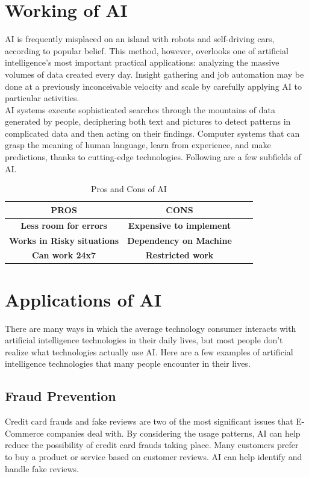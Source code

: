 \documentclass[conference]{IEEEtran}
\begin{document}
\section{Working of AI}
AI is frequently misplaced on an island with robots and self-driving cars, according to popular belief. This method, however, overlooks one of artificial intelligence's most important practical applications: analyzing the massive volumes of data created every day. Insight gathering and job automation may be done at a previously inconceivable velocity and scale by carefully applying AI to particular activities.\\
AI systems execute sophisticated searches through the mountains of data generated by people, deciphering both text and pictures to detect patterns in complicated data and then acting on their findings. Computer systems that can grasp the meaning of human language, learn from experience, and make predictions, thanks to cutting-edge technologies. Following are a few subfields of AI.\\

\begin{table}[htbp]
\caption{Pros and Cons of AI}
\begin{center}
\begin{tabular}{|c|c|c|c|}
\hline
\textbf{PROS} & \textbf{CONS}\\\hline
\textbf{Less room for errors} & \textbf{Expensive to implement} \\ \hline
\textbf{Works in Risky situations} & \textbf{Dependency on Machine} \\ \hline
\textbf{Can work 24x7} & \textbf{Restricted work} \\ \hline
\end{tabular}
\label{Table 1}
\end{center}
\end{table}

\section{Applications of AI}
There are many ways in which the average technology consumer interacts with artificial intelligence technologies in their daily lives, but most people don’t realize what technologies actually use AI. Here are a few examples of artificial intelligence technologies that many people encounter in their lives.\\

\subsection{Fraud Prevention}
Credit card frauds and fake reviews are two of the most significant issues that E-Commerce companies deal with. By considering the usage patterns, AI can help reduce the possibility of credit card frauds taking place. Many customers prefer to buy a product or service based on customer reviews. AI can help identify and handle fake reviews.\\
\end{document}
